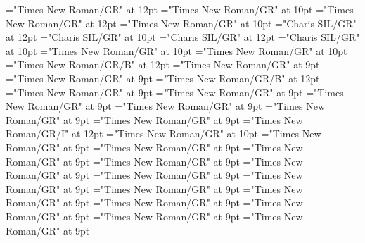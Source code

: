 \documentclass[gps1,twoside]{article}
\begin{document}
\pagestyle{plain}
\sloppy
\setlength{\parfillskip}{0pt plus 1fil}
\font\diven="Times New Roman/GR" at 12pt
\font\spanen="Times New Roman/GR" at 10pt
\font\divtpi="Times New Roman/GR" at 12pt
\font\spantpi="Times New Roman/GR" at 10pt
\font\divbzh="Charis SIL/GR" at 12pt
\font\spanbzh="Charis SIL/GR" at 10pt
\font\divbzhfonipa="Charis SIL/GR" at 12pt
\font\spanbzhfonipa="Charis SIL/GR" at 10pt
\font\spanfr="Times New Roman/GR" at 10pt
\font\spanes="Times New Roman/GR" at 10pt
\font\spanbzhmainheadwordentry="Times New Roman/GR/B" at 12pt
\font\spanspanmainheadwordentrybefore="Times New Roman/GR" at 9pt
\font\spanmainheadwordentrylastchildafter="Times New Roman/GR" at 9pt
\font\spanmainheadwordentry="Times New Roman/GR/B" at 12pt
\font\pronunciationpronunciationpronunciationsentrybefore="Times New Roman/GR" at 9pt
\font\pronunciationsentryafter="Times New Roman/GR" at 9pt
\font\spanspanformpronunciationpronunciationsentrybefore="Times New Roman/GR" at 9pt
\font\spanformpronunciationpronunciationsentryfirstchildbefore="Times New Roman/GR" at 9pt
\font\spanformpronunciationpronunciationsentrylastchildafter="Times New Roman/GR" at 9pt
\font\locationpronunciationpronunciationsentryafter="Times New Roman/GR" at 9pt
\font\locationpronunciationpronunciationsentry="Times New Roman/GR/I" at 12pt
\font\spanwritingsystemprefixspanabbreviationlocationpronunciationpronunciationsentry="Times New Roman/GR" at 10pt
\font\spanwritingsystemprefixspanabbreviationlocationpronunciationpronunciationsentryafter="Times New Roman/GR" at 9pt
\font\spanspanabbreviationlocationpronunciationpronunciationsentrybefore="Times New Roman/GR" at 9pt
\font\spanabbreviationlocationpronunciationpronunciationsentrylastchildafter="Times New Roman/GR" at 9pt
\font\spanspannamelocationpronunciationpronunciationsentrybefore="Times New Roman/GR" at 9pt
\font\spannamelocationpronunciationpronunciationsentrylastchildafter="Times New Roman/GR" at 9pt
\font\spanspanaliaslocationpronunciationpronunciationsentrybefore="Times New Roman/GR" at 9pt
\font\spanaliaslocationpronunciationpronunciationsentrylastchildafter="Times New Roman/GR" at 9pt
\font\spanspanvariantformentrybackrefsentrybefore="Times New Roman/GR" at 9pt
\font\variantformentrybackrefsentrybefore="Times New Roman/GR" at 9pt
\font\variantformentrybackrefsentryafter="Times New Roman/GR" at 9pt
\font\variantentrytypevariantentrytypevariantentrytypesvariantformentrybackrefvariantformentrybackrefsentrybefore="Times New Roman/GR" at 9pt
\font\variantentrytypesvariantformentrybackrefvariantformentrybackrefsentryafter="Times New Roman/GR" at 9pt
\font\spanspanreverseabbrvariantentrytypevariantentrytypesvariantformentrybackrefvariantformentrybackrefsentrybefore="Times New Roman/GR" at 9pt
\end{document}
